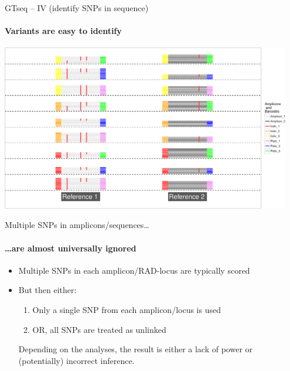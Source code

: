\documentclass[letter,graphicx]{beamer}
\begin{document}
\begin{frame}{GTseq -- IV (identify SNPs in sequence)}
\framesubtitle{Variants are easy to identify}
\begin{center}
\includegraphics[width=0.95\textwidth]{mhap_figs/gtseq-snps-crop.pdf}
\end{center}
\end{frame}




\begin{frame}{Multiple SNPs in amplicons/sequences\ldots}
\framesubtitle{\ldots are almost universally ignored }
\begin{itemize}
\item Multiple SNPs in each amplicon/RAD-locus are typically scored
\item But then either:
\begin{enumerate}
\item Only a single SNP from each amplicon/locus is used
\item OR, all SNPs are treated as unlinked
\end{enumerate}
Depending on the analyses, the result is either a lack of power or (potentially) incorrect inference.
\end{itemize}
\end{frame}
\end{document}
